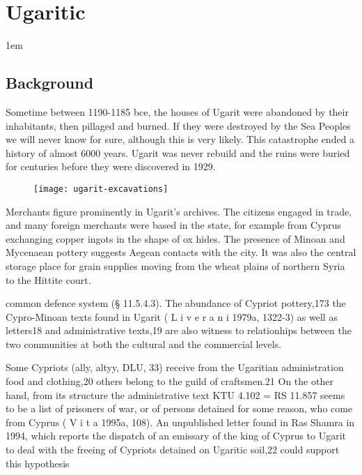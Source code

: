 \chapter{Ugaritic}
\label{s:ugaritic}
\parindent1em
\newfontfamily{}

\section{Background}
Sometime between 1190-1185 bce, the houses of Ugarit were abandoned by their inhabitants, then pillaged and burned. If they were destroyed by the Sea Peoples we will never know for sure, although this is very likely. This catastrophe ended a history of almost 6000 years. Ugarit was never rebuild and the ruins were buried for centuries before they were discovered in 1929. 

\begin{figure}[htbp]
\centering
\texttt{[image: ugarit-excavations]}
\end{figure}

Merchants figure prominently in Ugarit’s archives. The citizens engaged in trade, and many foreign merchants were based in the state, for example from Cyprus exchanging copper ingots in the shape of ox hides. The presence of Minoan and Mycenaean pottery suggests Aegean contacts with the city. It was also the central storage place for grain supplies moving from the wheat plains of northern Syria to the Hittite court.

common defence system (§ 11.5.4.3). The abundance of Cypriot
pottery,173 the Cypro-Minoan texts found in Ugarit ( L i v e r a n i 1979a,
1322-3) as well as letters18 and administrative texts,19 are also witness
to relationhips between the two communities at both the cultural
and the commercial levels. 

Some Cypriots (ally, altyy, DLU, 33)
receive from the Ugaritian administration food and clothing,20 others
belong to the guild of craftsmen.21 On the other hand, from its structure
the administrative text KTU 4.102 = RS 11.857 seems to be
a list of prisoners of war, or of persons detained for some reason,
who come from Cyprus ( V i t a 1995a, 108). An unpublished letter
found in Ras Shamra in 1994, which reports the dispatch of an
emissary of the king of Cyprus to Ugarit to deal with the freeing of
Cypriots detained on Ugaritic soil,22 could support this hypothesis

